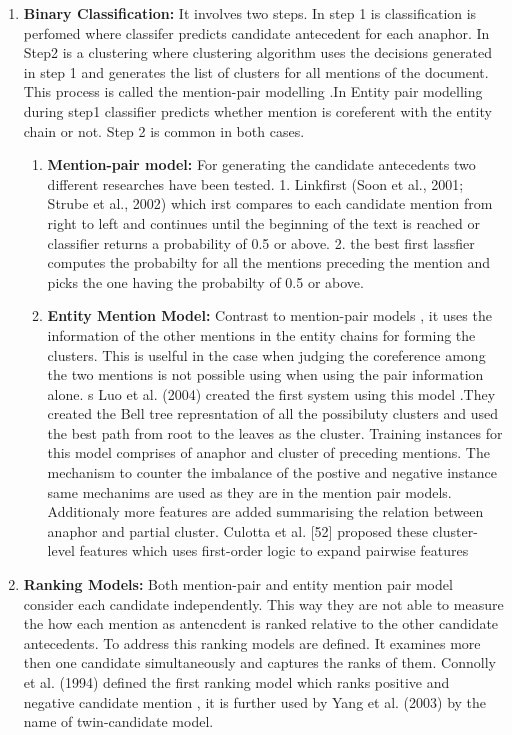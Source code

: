 \documentclass[11pt]{article}
\begin{document}
\begin {enumerate}
\item \textbf{Binary Classification:}
It involves two steps. In step 1 is classification is perfomed where classifer predicts  candidate antecedent for each anaphor. In Step2 is a clustering  where clustering algorithm uses the decisions generated in step 1 and generates the list of clusters for all mentions of the document. This process is called the mention-pair modelling .In Entity pair modelling during step1 classifier predicts whether mention is coreferent with the entity chain or not. Step 2 is common in both cases.


\begin {enumerate}
\item \textbf{Mention-pair model:}
For generating the candidate antecedents two different researches have been tested. 1. Linkfirst (Soon et al., 2001; Strube et al., 2002) which irst compares to each candidate mention from right to left and continues until the beginning of the text is reached or classifier returns a probability of 0.5 or above. 2. the best first lassfier computes the probabilty for all the mentions preceding the mention and picks the one having the probabilty of 0.5 or above.


\item \textbf{Entity Mention Model:}
Contrast to mention-pair models , it uses the information of the other mentions in the entity chains for forming the clusters. This is uselful in the case when judging the coreference among the two mentions is not possible using when using the pair information alone. s Luo et al. (2004) created the first system using this model .They created the Bell tree represntation of all the possibiluty clusters and used the best path from root to the leaves as the cluster. Training instances for this model comprises of anaphor and cluster of preceding mentions. The mechanism to counter the imbalance of the postive and negative instance same mechanims are used as they are in the mention pair models. Additionaly more features are added summarising the relation between anaphor and partial cluster. Culotta et al. [52] proposed these cluster-level features  which uses  first-order logic to expand pairwise features
\end {enumerate}
\item \textbf {Ranking Models:}
Both mention-pair and entity mention pair model consider each candidate independently. This way they are not able to measure the how each mention as antencdent is ranked relative to the other candidate antecedents. To address this ranking models are defined. It examines more then one candidate simultaneously and captures the ranks of them.  Connolly et al. (1994) defined the first ranking model which ranks positive and negative candidate mention , it is further used by  Yang et al. (2003) by the name of twin-candidate model.

\end {enumerate}
\end{document}
